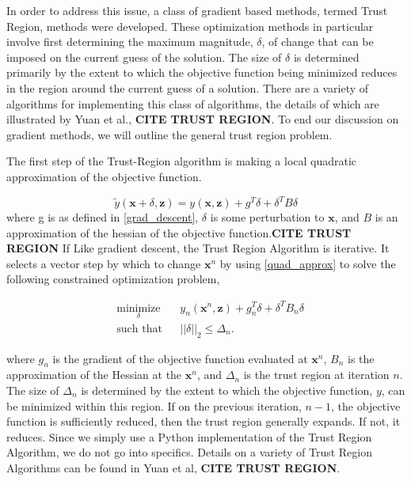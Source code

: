 In order to address this issue, a class of gradient based methods, termed Trust Region, methods were developed. These optimization methods in particular involve first determining the maximum magnitude, $\delta$, of change that can be imposed on the current guess of the solution. The size of $\delta$ is determined primarily by the extent to which the objective function being minimized reduces in the region around the current guess of a solution. There are a variety of algorithms for implementing this class of algorithms, the details of which are illustrated by Yuan et al., \textbf{CITE TRUST REGION}. To end our discussion on gradient methods, we will outline the general trust region problem.

The first step of the Trust-Region algorithm is making a local quadratic approximation of the objective function.

\begin{equation} \label{quad_approx}
    \tilde{y}(\mathbf{x}+\delta,\mathbf{z}) = y(\mathbf{x},\mathbf{z}) + g^T \delta + \delta^T B \delta 
\end{equation}
where g is as defined in \ref{grad_descent}, $\delta$ is some perturbation to $\mathbf{x}$, and $B$ is an approximation of the hessian of the objective function.\textbf{CITE TRUST REGION} If Like gradient descent, the Trust Region Algorithm is iterative. It selects a vector step by which to change $\mathbf{x}^n$ by using \ref{quad_approx} to solve the following constrained optimization problem,

\begin{equation} \label{trust_region_optim_problm}
\begin{aligned}
& \underset{\delta}{\text{minimize}}
& & y_n(\mathbf{x}^n,\mathbf{z}) + g_n^T \delta + \delta^T B_n \delta\\
& \text{such that}
& & ||\delta||_2 \leq \Delta_n.
\end{aligned}
\end{equation}

where $g_n$ is the gradient of the objective function evaluated at $\mathbf{x}^n$, $B_n$ is the approximation of the Hessian at the $\mathbf{x}^n$, and $\Delta_n$ is the trust region at iteration $n$. The size of $\Delta_n$ is determined by the extent to which the objective function, $y$, can be minimized within this region. If on the previous iteration, $n-1$, the objective function is sufficiently reduced, then the trust region generally expands. If not, it reduces. Since we simply use a Python implementation of the Trust Region Algorithm, we do not go into specifics. Details on a variety of Trust Region Algorithms can be found in Yuan et al, \textbf{CITE TRUST REGION}.  

